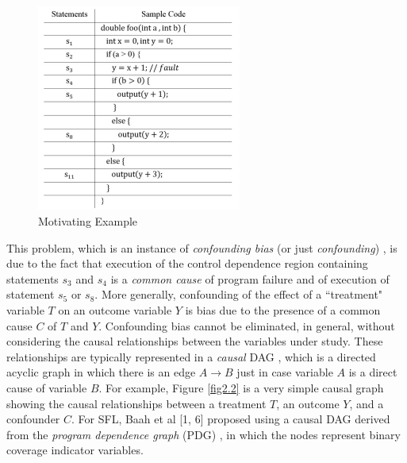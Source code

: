 \begin{figure}[htb!]
\vspace{0em}
\begin{center}
\includegraphics[width=0.6\textwidth]{chapter2_fig1.pdf}
\vspace {0em}\caption{Motivating Example} \label{fig2.1}
\end{center}
\vspace {0em}
\end{figure}

This problem, which is an instance of {\it confounding bias} (or just {\it confounding}) \cite{pearl2000models}, is due to the fact that execution of the control dependence region \cite{ball1993s} containing statements $s_3$ and $s_4$ is a {\it common cause} of program failure and of execution of statement $s_5$ or $s_8$.  More generally, confounding of the effect of a ``treatment" variable $T$ on an outcome variable $Y$ is bias due to the presence of a common cause $C$ of $T$ and $Y$.  Confounding bias cannot be eliminated, in general, without considering the causal relationships between the variables under study.  These relationships are typically represented in a {\it causal} DAG \cite{pearl2000models}, which is a directed acyclic graph in which there is an edge $A \rightarrow B$ just in case variable $A$ is a direct cause of variable $B$.  For example, Figure \ref{fig2.2} is a very simple causal graph showing the causal relationships between a treatment $T$, an outcome $Y$, and a confounder $C$.  For SFL, Baah et al [1, 6] proposed using a causal DAG derived from the {\it program dependence graph} (PDG) \cite{ferrante1987program}, in which the nodes represent binary coverage indicator variables.

